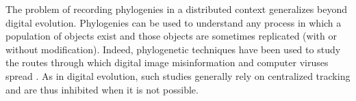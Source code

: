 The problem of recording phylogenies in a distributed context generalizes beyond digital evolution.
Phylogenies can be used to understand any process in which a population of objects exist and those objects are sometimes replicated (with or without modification).
Indeed, phylogenetic techniques have been used to study the routes through which digital image misinformation and computer viruses spread \citep{friggeri2014rumor,cohen1987computer}.
As in digital evolution, such studies generally rely on centralized tracking and are thus inhibited when it is not possible.




